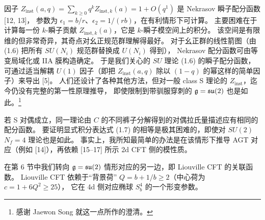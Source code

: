 因子 $Z_{\mathrm{inst}}(a,q)=\sum_{k\ge 0}q^k Z_{\mathrm{inst},k}(a)=1+O(q^1)$ 是 Nekrasov 瞬子配分函数 [12, 13]，
参数为 $\epsilon_1=b/r$、$\epsilon_2=1/(rb)$，在有利情形下可计算。
主要困难在于计算每一份 $k$-瞬子贡献 $Z_{\mathrm{inst},k}(a)$，它是 $k$-瞬子模空间上的积分。
该空间是有限维的但非常奇异，其奇点对幺正规范群理解得最好。
对于幺正群的线性箭图（由 (1.6) 把所有 $SU(N_i)$ 规范群替换成 $U(N_i)$ 得到），
Nekrasov 配分函数可由等变局域化或 IIA 膜构造确定。
于是我们关心的 $SU$ 理论 (1.6) 的瞬子配分函数，可通过适当解耦 $U(1)$ 因子（即把 $Z_{\mathrm{inst}}(a,q)$
除以 $(1-q)$ 的幂这样的简单因子）来导出 [5]。
人们还设计了各种其他方法，但对一般 class S 理论的 $Z_{\mathrm{inst}}$，迄今仍没有完整的第一性原理推导，
即使限制到带驯服穿刺的 $\mathfrak{g}=\mathfrak{su}(2)$ 也是如此。\footnote{感谢 Jaewon Song 就这一点所作的澄清。}

若 S 对偶成立，同一理论由 $C$ 的不同裤子分解得到的对偶拉氏量描述应有相同的配分函数。
要证明显式积分表达式 (1.7) 的相等是极其困难的，即使对 $SU(2)$ $N_f=4$ 理论也是如此。
事实上，我所知最简单的办法是在该情形下推导 AGT 对应（例如 [14]），再依赖 [15--17] 所示 2d CFT 侧的模性质。

在第 6 节中我们转向 $\mathfrak{g}=\mathfrak{su}(2)$ 情形对应的另一边，即 Liouville CFT 的关联函数。
Liouville CFT 依赖于“背景荷” $Q=b+1/b\ge 2$（中心荷为 $c=1+6Q^2\ge 25$），
它在 4d 侧对应椭球 $S^4_b$ 的一个形变参数。

